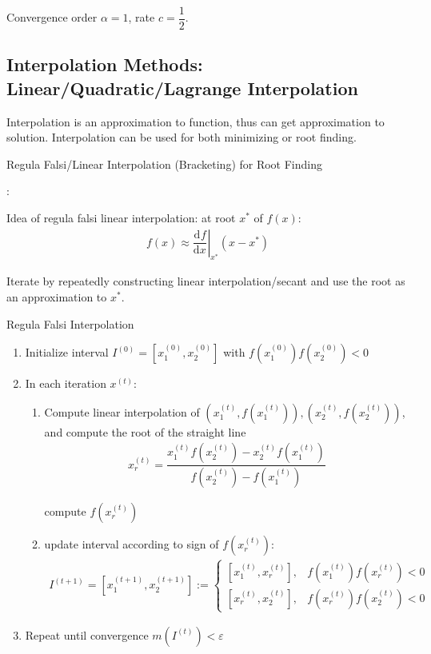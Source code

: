     Convergence order $ \alpha =1 $, rate $ c=\dfrac{1}{2} $.


\subsection{Interpolation Methods: Linear/Quadratic/Lagrange Interpolation}
    \hypertarget{Interpolation}{Interpolation} is an approximation to function, thus can get approximation to solution. Interpolation can be used for both minimizing or root finding.

\begin{point}
    \hypertarget{RegulaFalsi}{Regula Falsi/Linear Interpolation (Bracketing) for Root Finding}: 
\end{point}
    
    Idea of regula falsi linear interpolation: at root $ x^* $ of $ f(x) $:
    \begin{align}
        f(x) \approx\left. \dfrac{\mathrm{d}^{} f}{\mathrm{d}x^{}}\right|_{x^*}(x-x^*)
    \end{align}
    
    Iterate by repeatedly constructing linear interpolation/secant and use the root as an approximation to $ x^* $.

\begin{algorithm}{Regula Falsi Interpolation}
    \begin{enumerate}[topsep=2pt,itemsep=2pt]
        \item Initialize interval $ I^{(0)}=[x_1^{(0)},x_2^{(0)}] $ with $ f(x_1^{(0)})f(x_2^{(0)})<0 $
        \item In each iteration $ x^{(t)} $:
        \begin{enumerate}[topsep=2pt,itemsep=2pt]
            \item Compute linear interpolation of $ (x_1^{(t)},f(x_1^{(t)})),(x_2^{(t)},f(x_2^{(t)})) $, and compute the root of the straight line
            \begin{align}
                x_r^{(t)}=\dfrac{x_1^{(t)}f(x_2^{(t)})-x_2^{(t)}f(x_1^{(t)})}{f(x_2^{(t)})-f(x_1^{(t)})}
            \end{align}
        
            compute $ f(x_r^{(t)}) $
            \item update interval according to sign of $ f(x_r^{(t)}) $:
            \begin{align}
                I^{(t+1)}=[x_1^{(t+1)},x_2^{(t+1)}]:=\begin{cases}
                    [x_1^{(t)},x_r^{(t)}],& f(x_1^{(t)})f(x_r^{(t)})<0\\
                    [x_r^{(t)},x_2^{(t)}],& f(x_r^{(t)})f(x_2^{(t)})<0
                \end{cases} 
            \end{align}
        \end{enumerate}
        \item Repeat until convergence $ m(I^{(t)})<\varepsilon  $
    \end{enumerate}
\end{algorithm}
    



